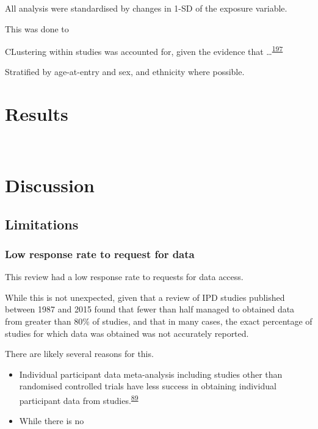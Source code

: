 \documentclass[a4paper, twoside]{templates/ociamthesis}
\begin{document}
All analysis were standardised by changes in 1-SD of the exposure variable.

This was done to

CLustering within studies was accounted for, given the evidence that \ldots{}\textsuperscript{\protect\hyperlink{ref-abo-zaid2013}{197}}

Stratified by age-at-entry and sex, and ethnicity where possible.

\hypertarget{results-2}{%
\section{Results}\label{results-2}}

~

\hypertarget{discussion-3}{%
\section{Discussion}\label{discussion-3}}

\hypertarget{limitations-1}{%
\subsection{Limitations}\label{limitations-1}}

\hypertarget{low-response-rate-to-request-for-data}{%
\subsubsection{Low response rate to request for data}\label{low-response-rate-to-request-for-data}}

This review had a low response rate to requests for data access.

While this is not unexpected, given that a review of IPD studies published between 1987 and 2015 found that fewer than half managed to obtained data from greater than 80\% of studies, and that in many cases, the exact percentage of studies for which data was obtained was not accurately reported.

There are likely several reasons for this.

\begin{itemize}
\item
  Individual participant data meta-analysis including studies other than randomised controlled trials have less success in obtaining individual participant data from studies.\textsuperscript{\protect\hyperlink{ref-nevitt2017a}{89}}
\item
  While there is no
\end{itemize}
\end{document}
